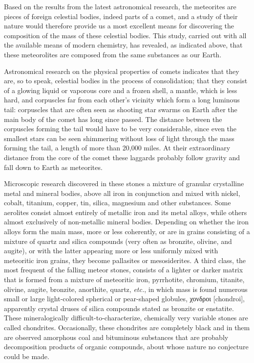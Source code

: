 \documentclass[a4paper, 12pt, oneside]{article}
\begin{document}
Based on the results from the latest astronomical research, the meteorites are pieces of foreign celestial bodies, indeed parts of a comet, and a study of their nature would therefore provide us a most excellent means for discovering the composition of the mass of these celestial bodies. This study, carried out with all the available means of modern chemistry, has revealed, as indicated above, that these meteorolites are composed from the same substances as our Earth.

Astronomical research on the physical properties of comets indicates that they are, so to speak, celestial bodies in the process of consolidation; that they consist of a glowing liquid or vaporous core and a frozen shell, a mantle, which is less hard, and corpuscles far from each other's vicinity which form a long luminous tail: corpuscles that are often seen as shooting star swarms on Earth after the main body of the comet has long since passed. The distance between the corpuscles forming the tail would have to be very considerable, since even the smallest stars can be seen shimmering without loss of light through the mass forming the tail, a length of more than 20,000 miles. At their extraordinary distance from the core of the comet these laggards probably follow gravity and fall down to Earth as meteorites.

Microscopic research discovered in these stones a mixture of granular crystalline metal and mineral bodies, above all iron in conjunction and mixed with nickel, cobalt, titanium, copper, tin, silica, magnesium and other substances. Some aerolites consist almost entirely of metallic iron and its metal alloys, while others almost exclusively of non-metallic mineral bodies. Depending on whether the iron alloys form the main mass, more or less coherently, or are in grains consisting of a mixture of quartz and silica compounds (very often as bronzite, olivine, and augite), or with the latter appearing more or less uniformly mixed with meteoritic iron grains, they become pallasites or mesosiderites. A third class, the most frequent of the falling meteor stones, consists of a lighter or darker matrix that is formed from a mixture of meteoritic iron, pyrrhotite, chromium, titanite, olivine, augite, bronzite, anorthite, quartz, \emph{etc.}, in which mass is found numerous small or large light-colored spherical or pear-shaped globules, χονδροι [chondroi], apparently crystal druses of silica compounds stated as bronzite or enstatite. These mineralogically difficult-to-characterize, chemically very variable stones are called chondrites. Occasionally, these chondrites are completely black and in them are observed amorphous coal and bituminous substances that are probably decomposition products of organic compounds, about whose nature no conjecture could be made.
\end{document}
